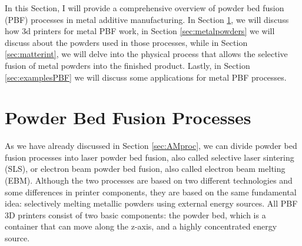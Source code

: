 \setlength{\tabcolsep}{10pt}
In this Section, I will provide a comprehensive overview of powder bed fusion (PBF) processes in metal additive manufacturing. In Section \ref{sec:pbf_proc}, we will discuss how 3d printers for metal PBF work, in Section \ref{sec:metalpowders} we will discuss about the powders used in those processes, while in Section \ref{sec:matterint}, we will delve into the physical process that allows the selective fusion of metal powders into the finished product. Lastly, in Section \ref{sec:examplesPBF} we will discuss some applications for metal PBF processes.

\section{Powder Bed Fusion Processes}\label{sec:pbf_proc}
As we have already discussed in Section \ref{sec:AMproc}, we can divide powder bed fusion processes into laser powder bed fusion, also called selective laser sintering (SLS), or electron beam powder bed fusion, also called electron beam melting (EBM). Although the two processes are based on two different technologies and some differences in printer components, they are based on the same fundamental idea: selectively melting metallic powders using external energy sources. All PBF 3D printers consist of two basic components: the powder bed, which is a container that can move along the z-axis, and a highly concentrated energy source. 


